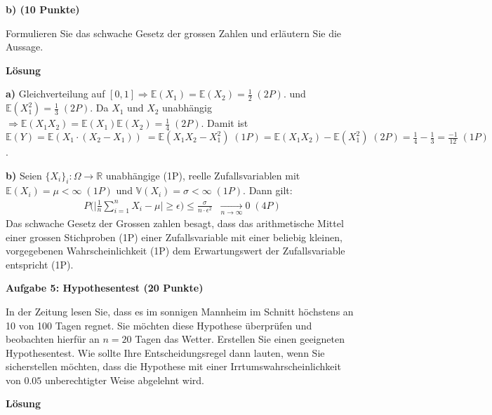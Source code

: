 \documentclass[a4paper,12pt]{article}
\begin{document}
{\bf b) (10 Punkte) }

Formulieren Sie das schwache Gesetz  der grossen Zahlen und erläutern Sie die Aussage.



{\bf Lösung}

{\bf a) }
Gleichverteilung auf  $[0,1] \Rightarrow  \mathbb{E}(X_1) =  \mathbb{E}(X_2) = \frac{1}{2} \; (2P)$. und $ \mathbb{E}(X_1^2) = \frac{1}{3} \; (2P)$. Da $X_1$ und $X_2$ unabhängig $\Rightarrow \mathbb{E}(X_1 X_2) =  \mathbb{E}(X_1)  \mathbb{E}(X_2)  = \frac{1}{4} \; (2P)$.  Damit ist $\mathbb{E}(Y) = \mathbb{E}( X_1 \cdot (X_2 - X_1)) \; = \mathbb{E}( X_1 X_2 - X_1^2)  \; (1P) = \mathbb{E}( X_1 X_2) - \mathbb{E}(X_1^2)  \; (2P) =  \frac{1}{4} - \frac{1}{3} = \frac{-1}{12} \; (1P)$. 


{\bf b) }
Seien $\{X_i  \}_i: \Omega \to \mathbb{R}$ unabhängige (1P), reelle Zufallsvariablen mit $\mathbb{E}(X_i) = \mu < \infty \; (1P)$ und $\mathbb{V}(X_i) = \sigma < \infty \; (1P)$. Dann gilt:
\begin{align*}
P \bigl  ( \bigl | \frac{1}{n} \sum_{i=1}^{n} X_i - \mu \bigr |  \geq \epsilon \bigr) \leq \frac{\sigma}{ n \cdot \epsilon^2} \; \; \underset{n \to \infty}{\longrightarrow} 0 \; (4P)
\end{align*}
Das schwache Gesetz der Grossen zahlen besagt, dass das arithmetische Mittel  einer grossen Stichproben (1P) einer Zufallsvariable mit einer beliebig kleinen, vorgegebenen Wahrscheinlichkeit (1P) dem Erwartungswert der Zufallsvariable entspricht (1P). 

\hspace{10mm}




{\bf Aufgabe 5: Hypothesentest  (20 Punkte)}

In der Zeitung lesen Sie, dass es im sonnigen Mannheim im Schnitt höchstens an 10 von 100 Tagen regnet. Sie möchten diese Hypothese überprüfen und beobachten hierfür an $n=20$ Tagen das Wetter. Erstellen Sie einen geeigneten Hypothesentest. 
Wie sollte Ihre Entscheidungsregel dann lauten, wenn Sie sicherstellen möchten, dass die Hypothese mit einer Irrtumswahrscheinlichkeit von $0.05$ unberechtigter Weise abgelehnt wird.

{\bf Lösung}
\end{document}
